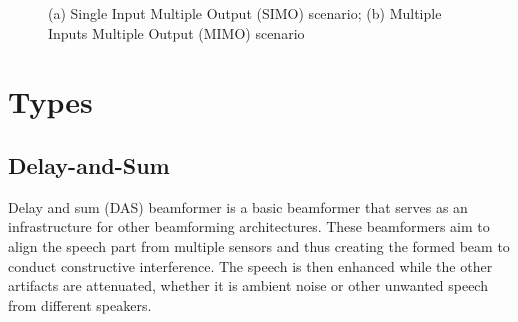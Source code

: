 \begin{figure}[H]
    \centering
    \hspace{0.1cm}
    \caption{(a) Single Input Multiple Output (SIMO) scenario; (b) Multiple Inputs Multiple Output (MIMO) scenario}
\end{figure}


\section{Types}

\subsection{Delay-and-Sum}
Delay and sum (DAS) beamformer is a basic beamformer that serves 
as an infrastructure for other beamforming architectures.
These beamformers aim to align the speech part from multiple 
sensors and thus creating the formed beam to conduct 
constructive interference. The speech is then enhanced while 
the other artifacts are attenuated, whether it is ambient noise 
or other unwanted speech from different speakers.

